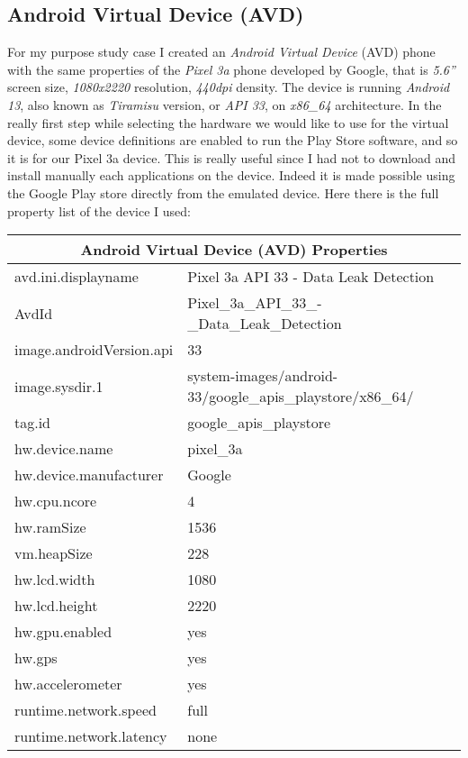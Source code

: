 		\subsection{Android Virtual Device (AVD)}
			\par For my purpose study case I created an \textit{Android Virtual Device} (AVD) phone with the same properties of the \textit{Pixel 3a} phone developed by Google, that is \textit{5.6''} screen size, \textit{1080x2220} resolution, \textit{440dpi} density. The device is running \textit{Android 13}, also known as \textit{Tiramisu} version, or \textit{API 33}, on \textit{x86\_64} architecture. In the really first step while selecting the hardware we would like to use for the virtual device, some device definitions are enabled to run the Play Store software, and so it is for our Pixel 3a device. This is really useful since I had not to download and install manually each applications on the device. Indeed it is made possible using the Google Play store directly from the emulated device. Here there is the full property list of the device I used:
			\begin{center}
				\begin{tabular}{ |p{5cm}||p{9cm}| }
					 \hline
					 \multicolumn{2}{|c|}{Android Virtual Device (AVD) Properties} \\
					 \hline
					 avd.ini.displayname & Pixel 3a API 33 - Data Leak Detection \\
					 AvdId & Pixel\_3a\_API\_33\_-\_Data\_Leak\_Detection \\
					 image.androidVersion.api & 33 \\
					 image.sysdir.1 & system-images/android-33/google\_apis\_playstore/x86\_64/ \\
					 tag.id & google\_apis\_playstore \\
					 hw.device.name & pixel\_3a \\
					 hw.device.manufacturer & Google \\
					 hw.cpu.ncore & 4 \\
					 hw.ramSize & 1536 \\
					 vm.heapSize & 228 \\
					 hw.lcd.width & 1080 \\
					 hw.lcd.height & 2220 \\
					 hw.gpu.enabled & yes \\
					 hw.gps & yes \\					 
					 hw.accelerometer & yes \\
					 runtime.network.speed & full\\
					 runtime.network.latency & none \\
					 \hline
				\end{tabular}
			\end{center}

